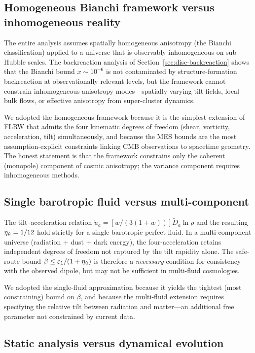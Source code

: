 \subsection{Homogeneous Bianchi framework versus
  inhomogeneous reality}

The entire analysis assumes spatially homogeneous anisotropy
(the Bianchi classification) applied to a universe that is
observably inhomogeneous on sub-Hubble scales.  The backreaction
analysis of Section~\ref{sec:disc-backreaction} shows that the
Bianchi bound $x \sim 10^{-6}$ is not contaminated by
structure-formation backreaction at observationally relevant
levels, but the framework cannot constrain inhomogeneous
anisotropy modes---spatially varying tilt fields, local bulk
flows, or effective anisotropy from super-cluster dynamics.

We adopted the homogeneous framework because it is the simplest
extension of FLRW that admits the four kinematic degrees of
freedom (shear, vorticity, acceleration, tilt) simultaneously,
and because the MES bounds are the most assumption-explicit
constraints linking CMB observations to spacetime geometry.
The honest statement is that the framework constrains only the
coherent (monopole) component of cosmic anisotropy; the
variance component requires inhomogeneous methods.


\subsection{Single barotropic fluid versus multi-component}

The tilt--acceleration relation
$\dot{u}_a = [w/(3(1+w))]\tilde{D}_a\!\ln\rho$ and the
resulting $\eta_{\dot{u}} = 1/12$ hold strictly for a single
barotropic perfect fluid.  In a multi-component universe
(radiation + dust + dark energy), the four-acceleration retains
independent degrees of freedom not captured by the tilt
rapidity alone.  The safe-route bound
$\beta \leq \varepsilon_1/(1 + \eta_{\dot{u}})$ is therefore a
\emph{necessary} condition for consistency with the observed
dipole, but may not be sufficient in multi-fluid cosmologies.

We adopted the single-fluid approximation because it yields the
tightest (most constraining) bound on $\beta$, and because the
multi-fluid extension requires specifying the relative tilt
between radiation and matter---an additional free parameter not
constrained by current data.


\subsection{Static analysis versus dynamical evolution}

